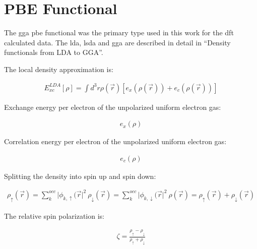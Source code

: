 \chapter{PBE Functional}
\label{chaper:pbefunctional}

The \acrshort{gga} \acrshort{pbe} functional was the primary type used in this work for the \acrshort{dft} calculated data.  The \acrshort{lda}, \acrshort{lsda} and \acrshort{gga} are described in detail in \enquote{Density functionals from LDA to GGA}\cite{ldaggaperdew}.

The local density approximation is:

\begin{equation}
\begin{split}
E_{xc}^{LDA} [\rho] = \int d^3r \rho(\vec{r}) \left[e_x(\rho(\vec{r})) + e_c(\rho(\vec{r})) \right ]
\end{split}
\label{eq:functional1}
\end{equation}

Exchange energy per electron of the unpolarized uniform electron gas:

\begin{equation}
\begin{split}
e_x (\rho)
\end{split}
\label{eq:functional2}
\end{equation}

Correlation energy per electron of the unpolarized uniform electron gas:

\begin{equation}
\begin{split}
e_c (\rho)
\end{split}
\label{eq:functional3}
\end{equation}

Splitting the density into spin up and spin down:

\begin{equation}
\begin{split}
\rho_{\uparrow} (\vec{r}) = \sum_k^{occ} \lvert \phi_{k,\uparrow} (\vec{r} \rvert^2 \
\rho_{\downarrow} (\vec{r}) = \sum_k^{occ} \lvert \phi_{k,\downarrow} (\vec{r} \rvert^2 \
\rho(\vec{r}) = \rho_{\uparrow} (\vec{r}) + \rho_{\downarrow} (\vec{r})
\end{split}
\label{eq:functional4}
\end{equation}

The relative spin polarization is:

\begin{equation}
\begin{split}
\zeta = \frac{\rho_{\uparrow} - \rho_{\downarrow}}{\rho_{\uparrow} + \rho_{\downarrow}}
\end{split}
\label{eq:functional5}
\end{equation}


